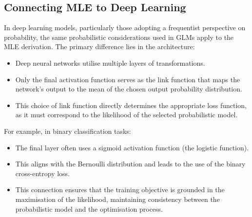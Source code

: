 \subsection{Connecting MLE to Deep Learning}

In deep learning models, particularly those adopting a frequentist perspective on probability, the same probabilistic considerations used in GLMs apply to the MLE derivation. The primary difference lies in the architecture:
\begin{itemize}
    \item Deep neural networks utilise multiple layers of transformations.
    \item Only the final activation function serves as the link function that maps the network's output to the mean of the chosen output probability distribution.
    \item This choice of link function directly determines the appropriate loss function, as it must correspond to the likelihood of the selected probabilistic model.
\end{itemize}

For example, in binary classification tasks:
\begin{itemize}
    \item The final layer often uses a sigmoid activation function (the logistic function).
    \item This aligns with the Bernoulli distribution and leads to the use of the binary cross-entropy loss.
    \item This connection ensures that the training objective is grounded in the maximisation of the likelihood, maintaining consistency between the probabilistic model and the optimisation process.
\end{itemize}




